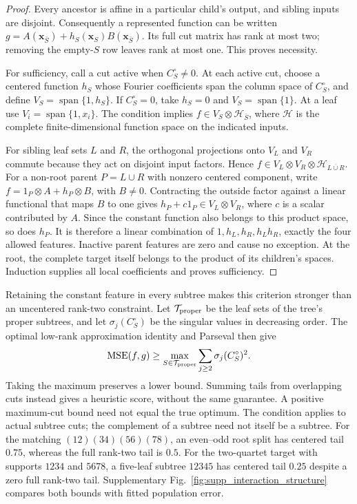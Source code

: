 \begin{proof}
Every ancestor is affine in a particular child's output, and sibling inputs
are disjoint. Consequently a represented function can be written
$g=A(\bm x_{\bar S})+h_S(\bm x_S)B(\bm x_{\bar S})$. Its full cut matrix
has rank at most two; removing the empty-$S$ row leaves rank at most one.
This proves necessity.

For sufficiency, call a cut active when $C_S^\circ\ne0$. At each active
cut, choose a centered function $h_S$ whose
Fourier coefficients span the column space of $C_S^\circ$, and define
$V_S=\operatorname{span}\{1,h_S\}$. If $C_S^\circ=0$, take $h_S=0$ and
$V_S=\operatorname{span}\{1\}$. At a leaf use
$V_i=\operatorname{span}\{1,x_i\}$. The condition implies
$f\in V_S\otimes\mathcal H_{\bar S}$, where $\mathcal H$ is the complete
finite-dimensional function space on the indicated inputs.

For sibling leaf sets $L$ and $R$, the orthogonal projections onto $V_L$
and $V_R$ commute because
they act on disjoint input factors. Hence
$f\in V_L\otimes V_R\otimes\mathcal H_{\overline{L\cup R}}$.
For a non-root parent $P=L\cup R$ with nonzero centered component, write
$f=1_P\otimes A+h_P\otimes B$, with $B\ne0$. Contracting the outside
factor against a linear functional that maps $B$ to one gives
$h_P+c1_P\in V_L\otimes V_R$, where $c$ is a scalar contributed by $A$. Since the constant function also belongs to
this product space, so does $h_P$. It is therefore a linear combination of
$1,h_L,h_R,h_Lh_R$, exactly the four allowed features. Inactive parent
features are zero and cause no exception. At the root, the complete target
itself belongs to the product of its children's spaces. Induction supplies
all local coefficients and proves sufficiency.
\end{proof}

Retaining the constant feature in every subtree makes this criterion
stronger than an uncentered rank-two constraint. Let
$\mathcal T_{\rm proper}$ be the leaf sets of the tree's proper subtrees,
and let $\sigma_j(C_S^\circ)$ be the singular values in decreasing
order. The optimal low-rank approximation identity and Parseval then give
\begin{equation}
 \operatorname{MSE}(f,g)\geq
 \max_{S\in\mathcal T_{\rm proper}}
       \sum_{j\geq2}\sigma_j(C_S^\circ)^2.
 \label{eq:s_centered_cut_bound}
\end{equation}
Taking the maximum preserves a lower bound. Summing tails from overlapping
cuts instead gives a heuristic score, without the same guarantee. A positive maximum-cut bound need not equal the true optimum.
The condition applies to actual subtree cuts; the complement of a subtree
need not itself be a subtree. For the matching $(12)(34)(56)(78)$, an
even--odd root split has centered tail $0.75$, whereas the full rank-two tail
is $0.5$. For the two-quartet target with supports $1234$ and $5678$, a
five-leaf subtree $12345$ has centered tail $0.25$ despite a zero full
rank-two tail. Supplementary Fig.~\ref{fig:supp_interaction_structure}
compares both bounds with fitted population error.

